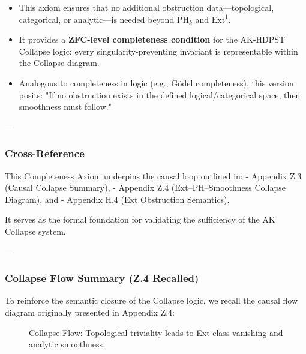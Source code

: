 \documentclass[11pt]{article}
\begin{document}
\begin{axiom}
\begin{axiom}
{{\begin{itemize}
  \item This axiom ensures that no additional obstruction data—topological, categorical, or analytic—is needed beyond \(\mathrm{PH}_k\) and \(\mathrm{Ext}^1\).
  \item It provides a \textbf{ZFC-level completeness condition} for the AK-HDPST Collapse logic:  
  every singularity-preventing invariant is representable within the Collapse diagram.
  \item Analogous to completeness in logic (e.g., Gödel completeness), this version posits:  
  "If no obstruction exists in the defined logical/categorical space, then smoothness must follow."
\end{itemize}

---

\subsubsection*{Cross-Reference}

This Completeness Axiom underpins the causal loop outlined in:
- Appendix Z.3 (Causal Collapse Summary),
- Appendix Z.4 (Ext–PH–Smoothness Collapse Diagram), and
- Appendix H.4 (Ext Obstruction Semantics).

It serves as the formal foundation for validating the sufficiency of the AK Collapse system.

---

\subsubsection*{Collapse Flow Summary (Z.4 Recalled)}

To reinforce the semantic closure of the Collapse logic,  
we recall the causal flow diagram originally presented in Appendix Z.4:

\begin{figure}[H]
\centering
{}
\caption{Collapse Flow: Topological triviality leads to Ext-class vanishing and analytic smoothness.}
\end{figure}



}}
\end{axiom}
\end{axiom}
\end{document}
